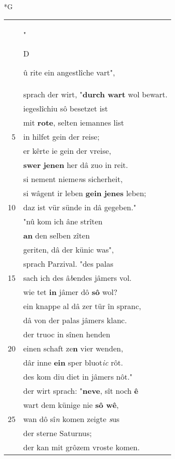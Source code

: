 \documentclass[8pt,a4paper,notitlepage]{article}
\begin{document}
\newpage
\begin{table}[ht]
\begin{minipage}[t]{0.5\linewidth}
\small
\begin{center}*G
\end{center}
\begin{tabular}{rl}
 & "\begin{large}D\end{large}û rite ein angestlîche vart",\\ 
 & sprach der wirt, "\textbf{durch wart} wol bewart.\\ 
 & iegeslîchiu sô besetzet ist\\ 
 & mit \textbf{rote}, selten iemannes list\\ 
5 & in hilfet gein der reise;\\ 
 & er kêrte ie gein der vreise,\\ 
 & \textbf{swer} \textbf{jenen} her dâ zuo in reit.\\ 
 & si nement nieme\textit{n}s sicherheit,\\ 
 & si wâgent ir leben \textbf{gein} \textbf{jenes} leben;\\ 
10 & daz ist vür sünde in dâ gegeben."\\ 
 & "nû kom ich âne strîten\\ 
 & \textbf{an} den selben zîten\\ 
 & geriten, dâ der künic was",\\ 
 & sprach Parzival. "des palas\\ 
15 & sach ich des â\textit{b}endes jâmers vol.\\ 
 & wie tet \textbf{in} jâmer dô \textbf{sô} wol?\\ 
 & ein knappe al dâ zer tür în spranc,\\ 
 & dâ von der palas jâmers klanc.\\ 
 & der truoc in sînen henden\\ 
20 & einen schaft ze\textbf{n} vier wenden,\\ 
 & dâr inne \textbf{ein} sper bluot\textit{ic} rôt.\\ 
 & des kom diu diet in jâmers nôt."\\ 
 & der wirt sprach: "\textbf{neve}, sît noch \textbf{ê}\\ 
 & wart dem künige nie \textbf{sô wê},\\ 
25 & wan dô sî\textit{n} komen zeigte \textit{s}us\\ 
 & der sterne Saturnus;\\ 
 & der kan mit grôzem vroste komen.\\ 

\end{tabular}
\end{minipage}
\end{table}
\end{document}
